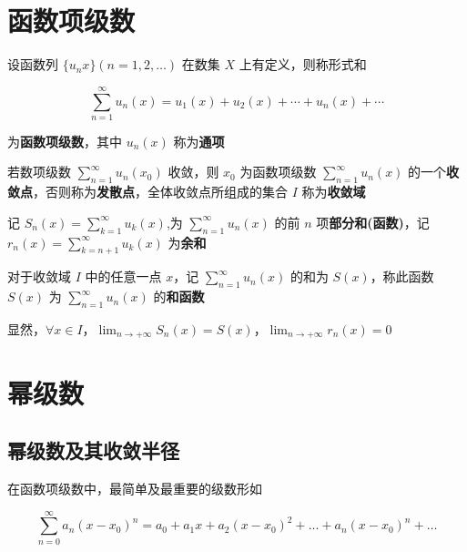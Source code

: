 \documentclass[lang = zh , final , oneside , openany , titlepage , zihao = -4 , linespread = 1.3 , baselineskip = false , cjk-font = windows , text-font = newtx , math-font = newtx , math-style = ISO , uppercase-greek = upright , integral-limits = false]{sjtureport}
\begin{document}
\section{函数项级数}

\begin{definition}
    设函数列 \(\{u_n{x}\} (n=1,2,\ldots)\) 在数集 \(X\) 上有定义，则称形式和

\[\sum_{n=1}^\infty u_n(x)= u_1(x) + u_2(x) + \cdots + u_n(x) + \cdots\]

为\textbf{函数项级数}，其中 \(u_n(x)\) 称为\textbf{通项}
\end{definition}

\begin{definition}
    若数项级数 \(\displaystyle \sum_{n=1}^\infty u_n(x_0)\) 收敛，则 \(x_0\)
为函数项级数 \(\displaystyle \sum_{n=1}^\infty u_n(x)\)
的一个\textbf{收敛点}，否则称为\textbf{发散点}，全体收敛点所组成的集合
\(I\) 称为\textbf{收敛域}
\end{definition}

\begin{definition}
    记 \(\displaystyle S_n(x) =\sum_{k=1}^\infty u_k(x)\),为
\(\displaystyle \sum_{n=1}^\infty u_n(x)\) 的前 \(n\)
项\textbf{部分和(函数)}，记
\(\displaystyle r_n(x) = \sum_{k=n+1}^\infty u_k(x)\) 为\textbf{余和}
\end{definition}

\begin{definition}
    对于收敛域 \(I\) 中的任意一点 \(x\)，记
\(\displaystyle \sum_{n=1}^\infty u_n(x)\) 的和为 \(S(x)\)，称此函数
\(S(x)\) 为 \(\displaystyle \sum_{n=1}^\infty u_n(x)\) 的\textbf{和函数}

显然，\(\forall x\in I\)，\(\displaystyle \lim_{n\to +\infty}S_n(x) =S(x)\)，\(\displaystyle \lim_{n\to +\infty}r_n(x)=0\)
\end{definition}

\section{幂级数}

\subsection{幂级数及其收敛半径}

在函数项级数中，最简单及最重要的级数形如

\[\sum_{n=0}^\infty a_n(x-x_0)^n = a_0 +a_1x + a_2(x-x_0)^2 + \ldots + a_n(x-x_0)^n + \ldots\]
\end{document}

